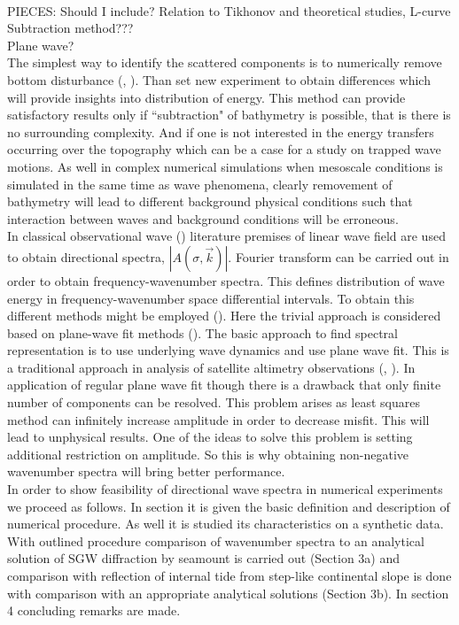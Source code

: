 ~\\
PIECES: Should I include?
Relation to Tikhonov and theoretical studies, L-curve\\
Subtraction method???\\
Plane wave?\\
The simplest way to identify the scattered components is to numerically remove bottom disturbance (\cite{kowalik2008kuril}, \cite{klymak2016reflection}). Than set new experiment to obtain differences which will provide insights into distribution of energy. This method can provide satisfactory results only if ``subtraction" of bathymetry is possible, that is there is no surrounding complexity. And if one is not interested in the energy transfers occurring over the topography which can be a case for a study on trapped wave motions. As well in complex numerical simulations when mesoscale conditions is simulated in the same time as wave phenomena, clearly removement of bathymetry will lead to different background physical conditions such that interaction between waves and background conditions will be erroneous.\\
In classical observational wave () literature premises of linear wave field are used to obtain directional spectra, $|A(\sigma, \vec{k})|$. Fourier transform can be carried out in order to obtain frequency-wavenumber spectra. This defines distribution of wave energy in frequency-wavenumber space differential intervals. To obtain this different methods might be employed (). Here the trivial approach is considered based on plane-wave fit methods (). The basic approach to find spectral representation is to use underlying wave dynamics and use plane wave fit. This is a traditional approach in analysis of satellite altimetry observations (\cite{ray2001estimates}, \cite{zhao2016global}). In application of regular plane wave fit though there is a drawback that only finite number of components can be resolved. This problem arises as least squares method can infinitely increase amplitude in order to decrease misfit. This will lead to unphysical results. One of the ideas to solve this problem is setting additional restriction on amplitude. So this is why obtaining non-negative wavenumber spectra will bring better performance.\\
In order to show feasibility of directional wave spectra in numerical experiments we proceed as follows. In section it is given the basic definition and description of numerical procedure. As well it is studied its characteristics on a synthetic data. With outlined procedure comparison of wavenumber spectra to an analytical solution of SGW diffraction by seamount is carried out (Section 3a) and comparison with reflection of internal tide from step-like continental slope is done with comparison with an appropriate analytical solutions (Section 3b). In section 4 concluding remarks are made.\\
~\\

